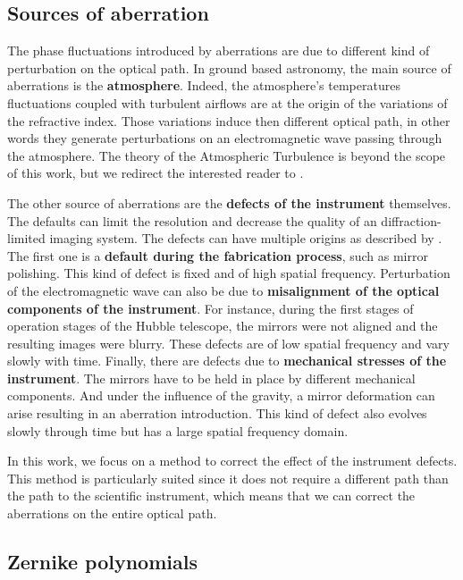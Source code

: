 \subsection{Sources of aberration}
\label{subsec:SourcesAb}

The phase fluctuations introduced by aberrations are due to different kind of perturbation on the optical path. In ground based astronomy, the main source of aberrations is the \textbf{atmosphere}. Indeed, the atmosphere's temperatures fluctuations coupled with turbulent airflows are at the origin of the variations of the refractive index. Those variations induce then different optical path, in other words they generate perturbations on an electromagnetic wave passing through the atmosphere. The theory of the Atmospheric Turbulence is beyond the scope of this work, but we redirect the interested reader to \citet{obukhov1949,Tatarski1961,kolmogorov1968}.

The other source of aberrations are the \textbf{defects of the instrument} themselves. The defaults can limit the resolution and decrease the quality of an diffraction-limited imaging system. The defects can have multiple origins as described by \citet{Blanc2002}. The first one is a \textbf{default during the fabrication process}, such as mirror polishing. This kind of defect is fixed and of high spatial frequency. Perturbation of the electromagnetic wave can also be due to \textbf{misalignment of the optical components of the instrument}. For instance, during the first stages of operation stages of the Hubble telescope, the mirrors were not aligned and the resulting images were blurry. These defects are of low spatial frequency and vary slowly with time. Finally, there are defects due to \textbf{mechanical stresses of the instrument}. The mirrors have to be held in place by different mechanical components. And under the influence of the gravity, a mirror deformation can arise resulting in an aberration introduction. This kind of defect also evolves slowly through time but has a large spatial frequency domain.

In this work, we focus on a method to correct the effect of the instrument defects. This method is particularly suited since it does not require a different path than the path to the scientific instrument, which means that we can correct the aberrations on the entire optical path.

\subsection{Zernike polynomials}
\label{subsec:ZernikePol}

